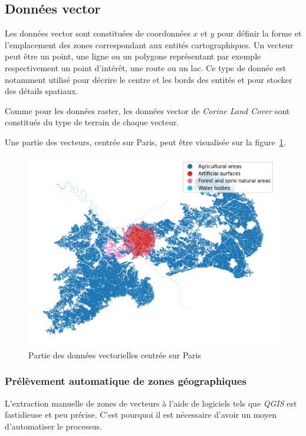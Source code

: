 \subsection{Données vector}


Les données vector sont constituées de coordonnées $x$ et $y$ pour définir la forme et l'emplacement des zones correspondant aux entités cartographiques.
Un vecteur peut être un point, une ligne ou un polygone représentant par exemple respectivement un point d'intérêt, une route ou un lac.
Ce type de donnée est notamment utilisé pour décrire le centre et les bords des entités et pour stocker des détails spatiaux.

Comme pour les données raster, les données vector de \emph{Corine Land Cover} sont constitués du type de terrain de chaque vecteur.

Une partie des vecteurs, centrée sur Paris, peut être visualisée sur la figure~\ref{fig:vector}.


\begin{figure}[!h]
    \centering
    \includegraphics[scale=0.5]{figures/vector}
    \caption{Partie des données vectorielles centrée sur Paris}
    \label{fig:vector}
\end{figure}

\subsubsection{Prélèvement automatique de zones géographiques}

L'extraction manuelle de zones de vecteurs à l'aide de logiciels tels que \emph{QGIS} est fastidieuse et peu précise.
C'est pourquoi il est nécessaire d'avoir un moyen d'automatiser le processus.

